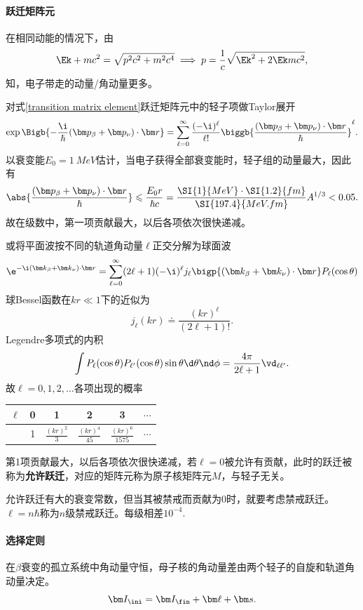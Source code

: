 \paragraph{跃迁矩阵元}在相同动能的情况下，由
\[
	\Ek+mc^2=\sqrt{p^2c^2+m^2c^4}\implies p=\frac1c\sqrt{\Ek^2+2\Ek mc^2},
\]
知，电子带走的动量/角动量更多。

对式\eqref{transition matrix element}跃迁矩阵元中的轻子项做Taylor展开
\begin{align*}
	\exp\Bigb{-\frac\i\hbar(\bm p_\beta+\bm p_\nu)\cdot\bm r}=\sum_{\ell=0}^\infty\frac{(-\i)^\ell}{\ell!}\biggb{\frac{(\bm p_\beta+\bm p_\nu)\cdot\bm r}\hbar}^\ell.
\end{align*}
以衰变能$E_0=\SI{1}{MeV}$估计，当电子获得全部衰变能时，轻子组的动量最大，因此有
\[
	\abs{\frac{(\bm p_\beta+\bm p_\nu)\cdot\bm r}\hbar}\leqslant\frac{E_0r}{\hbar c}=\frac{\SI{1}{MeV}\cdot\SI{1.2}{fm}}{\SI{197.4}{MeV.fm}}A^{1/3}<0.05.
\]
故在级数中，第一项贡献最大，以后各项依次很快递减。

或将平面波按不同的轨道角动量$\ell$正交分解为球面波
\[
	\e^{-\i(\bm k_\beta+\bm k_\nu)\cdot\bm r}=\sum_{\ell=0}^\infty(2\ell+1)(-\i)^\ell j_\ell\bigp{(\bm k_\beta+\bm k_\nu)\cdot\bm r}P_\ell(\cos\theta)
\]
球Bessel函数在$kr\ll 1$下的近似为
\[
	j_\ell(kr)\doteq\frac{(kr)^\ell}{(2\ell+1)!}.
\]
Legendre多项式的内积
\[
	\int P_\ell(\cos\theta)P_{\ell'}(\cos\theta)\sin\theta\d\theta\nd\phi=\frac{4\pi}{2\ell+1}\vd_{\ell\ell'}.
\]
故$\ell=0,1,2,\ldots$各项出现的概率
\begin{center}
	\begin{tabular}{cccccc}
		\toprule
		$\ell$&0&1&2&3&$\cdots$\\
		\midrule
		&1&$\frac{(kr)^2}3$&$\frac{(kr)^4}{45}$&$\frac{(kr)^6}{1575}$&$\cdots$\\
		\bottomrule
	\end{tabular}
\end{center}
第1项贡献最大，以后各项依次很快递减，若$\ell=0$被允许有贡献，此时的跃迁被称为\textbf{允许跃迁}，对应的矩阵元称为原子核矩阵元$M$，与轻子无关。

允许跃迁有大的衰变常数，但当其被禁戒而贡献为0时，就要考虑禁戒跃迁。$\ell=n\hbar$称为$n$级禁戒跃迁。每级相差$10^{-4}.$
\paragraph{选择定则}在$\beta$衰变的孤立系统中角动量守恒，母子核的角动量差由两个轻子的自旋和轨道角动量决定。
\[
	\bm I_\ini=\bm I_\fin+\bm\ell+\bm s.
\]

